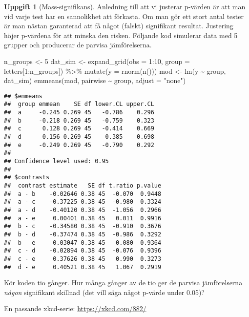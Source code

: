 \documentclass[
]{book}
\newenvironment{Shaded}{\begin{snugshade}}{\end{snugshade}}
\newcommand{\AttributeTok}[1]{\textcolor[rgb]{0.77,0.63,0.00}{#1}}
\newcommand{\DecValTok}[1]{\textcolor[rgb]{0.00,0.00,0.81}{#1}}
\newcommand{\FunctionTok}[1]{\textcolor[rgb]{0.00,0.00,0.00}{#1}}
\newcommand{\NormalTok}[1]{#1}
\newcommand{\OtherTok}[1]{\textcolor[rgb]{0.56,0.35,0.01}{#1}}
\newcommand{\SpecialCharTok}[1]{\textcolor[rgb]{0.00,0.00,0.00}{#1}}
\newcommand{\StringTok}[1]{\textcolor[rgb]{0.31,0.60,0.02}{#1}}
\theoremstyle{definition}
\theoremstyle{definition}
\theoremstyle{definition}
\newtheorem{exercise}{Uppgift}[chapter]
\theoremstyle{definition}
\theoremstyle{remark}
\begin{document}
\begin{exercise}[Mass-signifikans]
Anledning till att vi justerar p-värden är att man vid varje test har en sannolikhet att förkasta. Om man gör ett stort antal tester är man nästan garanterad att få något (falskt) signifikant resultat. Justering höjer p-värdena för att minska den risken. Följande kod simulerar data med 5 grupper och producerar de parvisa jämförelserna.

\begin{Shaded}
\begin{Highlighting}[]
\NormalTok{n\_groups }\OtherTok{\textless{}{-}} \DecValTok{5}
\NormalTok{dat\_sim }\OtherTok{\textless{}{-}} \FunctionTok{expand\_grid}\NormalTok{(}\AttributeTok{obs =} \DecValTok{1}\SpecialCharTok{:}\DecValTok{10}\NormalTok{, }\AttributeTok{group =}\NormalTok{ letters[}\DecValTok{1}\SpecialCharTok{:}\NormalTok{n\_groups]) }\SpecialCharTok{\%\textgreater{}\%} \FunctionTok{mutate}\NormalTok{(}\AttributeTok{y =} \FunctionTok{rnorm}\NormalTok{(}\FunctionTok{n}\NormalTok{()))}
\NormalTok{mod }\OtherTok{\textless{}{-}} \FunctionTok{lm}\NormalTok{(y }\SpecialCharTok{\textasciitilde{}}\NormalTok{ group, dat\_sim)}
\FunctionTok{emmeans}\NormalTok{(mod, pairwise }\SpecialCharTok{\textasciitilde{}}\NormalTok{ group, }\AttributeTok{adjust =} \StringTok{"none"}\NormalTok{)}
\end{Highlighting}
\end{Shaded}

\begin{verbatim}
## $emmeans
##  group emmean    SE df lower.CL upper.CL
##  a     -0.245 0.269 45   -0.786    0.296
##  b     -0.218 0.269 45   -0.759    0.323
##  c      0.128 0.269 45   -0.414    0.669
##  d      0.156 0.269 45   -0.385    0.698
##  e     -0.249 0.269 45   -0.790    0.292
## 
## Confidence level used: 0.95 
## 
## $contrasts
##  contrast estimate   SE df t.ratio p.value
##  a - b    -0.02646 0.38 45  -0.070  0.9448
##  a - c    -0.37225 0.38 45  -0.980  0.3324
##  a - d    -0.40120 0.38 45  -1.056  0.2966
##  a - e     0.00401 0.38 45   0.011  0.9916
##  b - c    -0.34580 0.38 45  -0.910  0.3676
##  b - d    -0.37474 0.38 45  -0.986  0.3292
##  b - e     0.03047 0.38 45   0.080  0.9364
##  c - d    -0.02894 0.38 45  -0.076  0.9396
##  c - e     0.37626 0.38 45   0.990  0.3273
##  d - e     0.40521 0.38 45   1.067  0.2919
\end{verbatim}

Kör koden tio gånger. Hur många gånger av de tio ger de parvisa jämförelserna \emph{någon} signifikant skillnad (det vill säga något p-värde under 0.05)?

En passande xkcd-serie: \url{https://xkcd.com/882/}
\end{exercise}
\end{document}
